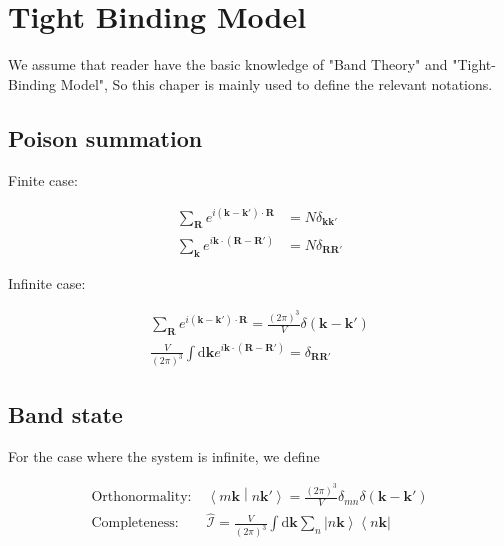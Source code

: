 \section{Tight Binding Model}

We assume that reader have the basic knowledge of "Band Theory" and "Tight-Binding Model",
So this chaper is mainly used to define the relevant notations.

\subsection{Poison summation}

\noindent
Finite case:

\begin{equation}
  \begin{aligned}
    \sum_{\boldsymbol{R}} e^{i(\boldsymbol{k}-\boldsymbol{k}') \cdot \boldsymbol{R}} &= N \delta_{\boldsymbol{k}\boldsymbol{k}'} \\
    \sum_{\boldsymbol{k}} e^{i\boldsymbol{k} \cdot (\boldsymbol{R}-\boldsymbol{R}')} &= N \delta_{\boldsymbol{R}\boldsymbol{R}'} 
  \end{aligned}
\end{equation}

\noindent
Infinite case:

\begin{equation}
  \begin{aligned}
    \sum_{\boldsymbol{R}} e^{i(\boldsymbol{k}-\boldsymbol{k}') \cdot \boldsymbol{R}} = \frac{(2\pi)^3}{V} \delta(\boldsymbol{k}-\boldsymbol{k}') \\
    \frac{V}{(2\pi)^3} \int \mathrm{d}\boldsymbol{k} e^{i\boldsymbol{k} \cdot (\boldsymbol{R}-\boldsymbol{R}')} = \delta_{\boldsymbol{R}\boldsymbol{R}'} 
  \end{aligned}
\end{equation}


\subsection{Band state}

For the case where the system is infinite, we define

\begin{equation}
  \begin{aligned}
    \text{Orthonormality:} \;&
    \left\langle m\boldsymbol{k} \middle| n\boldsymbol{k}' \right\rangle 
      = \frac{(2\pi)^3}{V} \delta_{mn} \delta(\boldsymbol{k}-\boldsymbol{k}') \\
    \text{Completeness:} \;&
    \hat{\mathcal{I}} = \frac{V}{(2\pi)^3} \int \mathrm{d}\boldsymbol{k} 
      \sum_{n} \left| n\boldsymbol{k} \right\rangle \left\langle n\boldsymbol{k} \right| 
  \end{aligned}
\end{equation}

